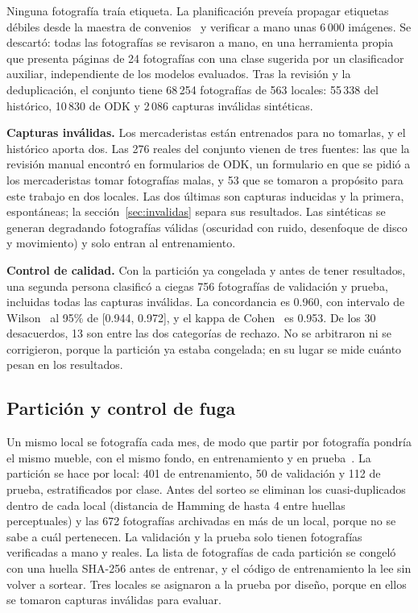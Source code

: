 \documentclass[conference]{IEEEtran}
\begin{document}
Ninguna fotografía traía etiqueta. La planificación preveía propagar etiquetas débiles desde la maestra de
convenios~\cite{northcutt2021} y verificar a mano unas 6\,000 imágenes. Se descartó: todas las fotografías se
revisaron a mano, en una herramienta propia que presenta páginas de 24 fotografías con una clase sugerida por un
clasificador auxiliar, independiente de los modelos evaluados. Tras la revisión y la deduplicación, el conjunto
tiene 68\,254 fotografías de 563 locales: 55\,338 del histórico, 10\,830 de ODK y 2\,086 capturas inválidas
sintéticas.

\textbf{Capturas inválidas.} Los mercaderistas están entrenados para no tomarlas, y el histórico aporta dos. Las
276 reales del conjunto vienen de tres fuentes: las que la revisión manual encontró en formularios de ODK, un
formulario en que se pidió a los mercaderistas tomar fotografías malas, y 53 que se tomaron a propósito para este
trabajo en dos locales. Las dos últimas son capturas inducidas y la primera, espontáneas; la
sección~\ref{sec:invalidas} separa sus resultados. Las sintéticas se generan degradando fotografías válidas
(oscuridad con ruido, desenfoque de disco y movimiento) y solo entran al entrenamiento.

\textbf{Control de calidad.} Con la partición ya congelada y antes de tener resultados, una segunda persona
clasificó a ciegas 756 fotografías de validación y prueba, incluidas todas las capturas inválidas. La concordancia
es 0.960, con intervalo de Wilson~\cite{wilson1927} al 95\% de [0.944, 0.972], y el kappa de
Cohen~\cite{cohen1960} es 0.953. De los 30 desacuerdos, 13 son entre las dos categorías de rechazo. No se
arbitraron ni se corrigieron, porque la partición ya estaba congelada; en su lugar se mide cuánto pesan en los
resultados.

\subsection{Partición y control de fuga}

Un mismo local se fotografía cada mes, de modo que partir por fotografía pondría el mismo mueble, con el mismo
fondo, en entrenamiento y en prueba~\cite{kapoor2023}. La partición se hace por local: 401 de entrenamiento, 50 de
validación y 112 de prueba, estratificados por clase. Antes del sorteo se eliminan los cuasi-duplicados dentro de
cada local (distancia de Hamming de hasta 4 entre huellas perceptuales) y las 672 fotografías archivadas en más de
un local, porque no se sabe a cuál pertenecen. La validación y la prueba solo tienen fotografías
verificadas a mano y reales. La lista de fotografías de cada partición se congeló con una huella SHA-256 antes de
entrenar, y el código de entrenamiento la lee sin volver a sortear. Tres locales se asignaron a la prueba por
diseño, porque en ellos se tomaron capturas inválidas para evaluar.
\end{document}
